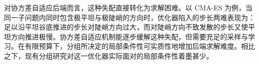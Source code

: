 对协方差自适应后端而言，这种失配直接转化为求解困难。以 CMA-ES 为例，当同一子问题内同时包含极平坦与极陡峭的方向时，优化器陷入的步长两难表现为：足以沿平坦谷底推进的步长对陡峭方向过大，而对陡峭方向不致发散的步长又使平坦方向推进极慢。协方差自适应机制能逐步缓解这种失配，但需要充足的采样与学习。在有限预算下，分组所决定的局部条件性可实质性地增加后端求解难度。相比之下，现有分组研究对这一优化器实际面对的局部条件性着墨甚少。